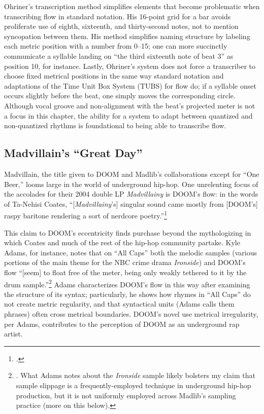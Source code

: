 Ohriner's transcription method simplifies elements that become problematic when transcribing flow
in standard notation. His 16-point grid for a bar avoids proliferate use of eighth, sixteenth, and
thirty-second notes, not to mention syncopation between them. His method simplifies naming structure
by labeling  each metric position with a number from 0--15; one can more succinctly communicate a 
syllable landing on ``the third sixteenth note of beat 3'' as position 10, for instance. Lastly, 
Ohriner's system does not force a transcriber to choose fixed metrical positions in the same way
standard notation and adaptations of the Time Unit Box System (TUBS) for flow do; if a syllable 
onset occurs slightly before the beat, one simply moves the corresponding circle. Although vocal
groove and non-alignment with the beat's projected meter is not a focus in this chapter, the ability
for a system to adapt between quantized and non-quantized rhythms is foundational to being able to
transcribe flow.

\subsection*{\centering Madvillain's ``Great Day''}

Madvillain, the title given to DOOM and Madlib's collaborations except for ``One Beer,'' looms large
in the world of underground hip-hop. One unrelenting focus of the accolades for  their 2004 double LP 
\textit{Madvillainy} is DOOM's flow: in the words of Ta-Nehisi Coates, ``[\textit{Madvillainy}'s] 
singular sound came mostly from [DOOM's] raspy baritone rendering a sort of nerdcore poetry.''\footnote{
    \cite{ta-nehisicoatesMaskDoomNonconformist2009}.}

This claim to DOOM's eccentricity finds purchase beyond the mythologizing in which Coates and much of 
the rest of the hip-hop community partake. Kyle Adams, for instance, notes that on ``All Caps'' both the
melodic samples (various portions of the main theme for the NBC crime drama \textit{Ironside}) and DOOM's
flow ``[seem] to float free of the meter, being only weakly tethered to it by the drum sample.''\footnote{
    \cite{kyleadamsMetricalTechniquesFlow2009}. What Adams notes about the \textit{Ironside} sample likely
    bolsters my claim that sample slippage is a frequently-employed technique in underground hip-hop 
    production, but it is not uniformly employed across Madlib's sampling practice (more on this below).}
Adams characterizes DOOM's flow in this way after examining the structure of its syntax; particularly, he
shows how rhymes in ``All Caps'' do not create metric regularity, and that syntactical units (Adams calls
them phrases) often cross metrical boundaries. DOOM's novel use metrical irregularity, per Adams, contributes
to the perception of DOOM as an underground rap artist.

